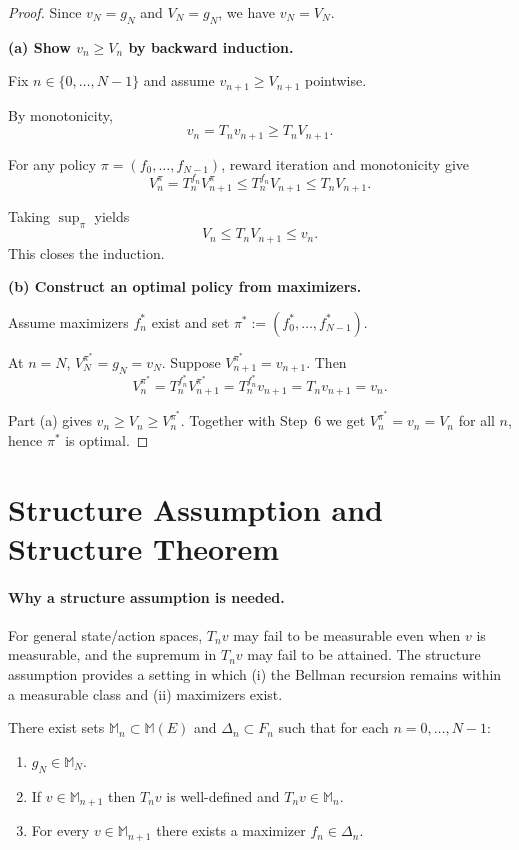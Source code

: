 \begin{proof}
Since $v_N=g_N$ and $V_N=g_N$, we have $v_N=V_N$.

\medskip
\noindent\textbf{(a) Show $v_n\ge V_n$ by backward induction.}

Fix $n\in\{0,\dots,N-1\}$ and assume $v_{n+1}\ge V_{n+1}$ pointwise.

By monotonicity,
\[
v_n=T_n v_{n+1}\ge T_n V_{n+1}.
\]

For any policy $\pi=(f_0,\dots,f_{N-1})$, reward iteration and monotonicity give
\[
V_n^{\pi}=T_n^{f_n}V_{n+1}^{\pi}\le T_n^{f_n}V_{n+1}\le T_n V_{n+1}.
\]

Taking $\sup_{\pi}$ yields
\[
V_n\le T_n V_{n+1}\le v_n.
\]
This closes the induction.

\medskip
\noindent\textbf{(b) Construct an optimal policy from maximizers.}

Assume maximizers $f_n^*$ exist and set $\pi^*:=(f_0^*,\dots,f_{N-1}^*)$.

At $n=N$, $V_N^{\pi^*}=g_N=v_N$.
Suppose $V_{n+1}^{\pi^*}=v_{n+1}$.
Then
\[
V_n^{\pi^*}=T_n^{f_n^*}V_{n+1}^{\pi^*}
= T_n^{f_n^*}v_{n+1}
= T_n v_{n+1}
= v_n.
\]

Part (a) gives $v_n\ge V_n\ge V_n^{\pi^*}$.
Together with Step~6 we get $V_n^{\pi^*}=v_n=V_n$ for all $n$, hence $\pi^*$ is optimal.
\end{proof}

\section{Structure Assumption and Structure Theorem}

\paragraph{Why a structure assumption is needed.}
For general state/action spaces, $T_n v$ may fail to be measurable even when $v$ is measurable, and the supremum in $T_n v$ may fail to be attained. The structure assumption provides a setting in which (i) the Bellman recursion remains within a measurable class and (ii) maximizers exist.

\begin{definition}
There exist sets $\mathcal{\mathbb{M}}_n\subset\mathcal{\mathbb{M}}(E)$ and $\Delta_n\subset F_n$ such that for each $n=0,\dots,N-1$:
\begin{enumerate}[label=(\roman*)]
  \item $g_N\in \mathcal{\mathbb{M}}_N$.
  \item If $v\in\mathcal{\mathbb{M}}_{n+1}$ then $T_n v$ is well-defined and $T_n v\in\mathcal{\mathbb{M}}_n$.
  \item For every $v\in\mathcal{\mathbb{M}}_{n+1}$ there exists a maximizer $f_n\in\Delta_n$.
\end{enumerate}
\end{definition}

